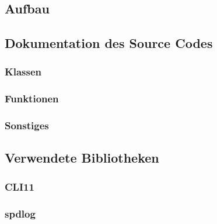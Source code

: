 \documentclass[a4paper,12pt]{exam}
\begin{document}
\subsection{Aufbau}

\subsection{Dokumentation des Source Codes}
\subsubsection{Klassen}
\subsubsection{Funktionen}
\subsubsection{Sonstiges}

\subsection{Verwendete Bibliotheken}
\subsubsection{CLI11}
\subsubsection{spdlog}



\begin{verbatim}
\end{verbatim}
\end{document}
